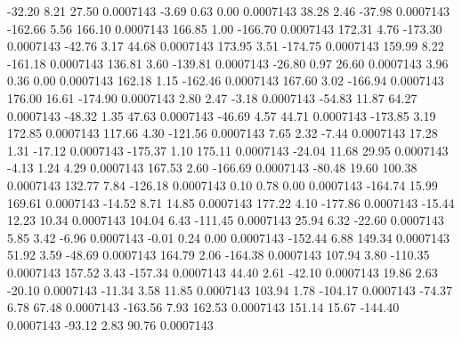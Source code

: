       -32.20        8.21       27.50     0.0007143
       -3.69        0.63        0.00     0.0007143
       38.28        2.46      -37.98     0.0007143
     -162.66        5.56      166.10     0.0007143
      166.85        1.00     -166.70     0.0007143
      172.31        4.76     -173.30     0.0007143
      -42.76        3.17       44.68     0.0007143
      173.95        3.51     -174.75     0.0007143
      159.99        8.22     -161.18     0.0007143
      136.81        3.60     -139.81     0.0007143
      -26.80        0.97       26.60     0.0007143
        3.96        0.36        0.00     0.0007143
      162.18        1.15     -162.46     0.0007143
      167.60        3.02     -166.94     0.0007143
      176.00       16.61     -174.90     0.0007143
        2.80        2.47       -3.18     0.0007143
      -54.83       11.87       64.27     0.0007143
      -48.32        1.35       47.63     0.0007143
      -46.69        4.57       44.71     0.0007143
     -173.85        3.19      172.85     0.0007143
      117.66        4.30     -121.56     0.0007143
        7.65        2.32       -7.44     0.0007143
       17.28        1.31      -17.12     0.0007143
     -175.37        1.10      175.11     0.0007143
      -24.04       11.68       29.95     0.0007143
       -4.13        1.24        4.29     0.0007143
      167.53        2.60     -166.69     0.0007143
      -80.48       19.60      100.38     0.0007143
      132.77        7.84     -126.18     0.0007143
        0.10        0.78        0.00     0.0007143
     -164.74       15.99      169.61     0.0007143
      -14.52        8.71       14.85     0.0007143
      177.22        4.10     -177.86     0.0007143
      -15.44       12.23       10.34     0.0007143
      104.04        6.43     -111.45     0.0007143
       25.94        6.32      -22.60     0.0007143
        5.85        3.42       -6.96     0.0007143
       -0.01        0.24        0.00     0.0007143
     -152.44        6.88      149.34     0.0007143
       51.92        3.59      -48.69     0.0007143
      164.79        2.06     -164.38     0.0007143
      107.94        3.80     -110.35     0.0007143
      157.52        3.43     -157.34     0.0007143
       44.40        2.61      -42.10     0.0007143
       19.86        2.63      -20.10     0.0007143
      -11.34        3.58       11.85     0.0007143
      103.94        1.78     -104.17     0.0007143
      -74.37        6.78       67.48     0.0007143
     -163.56        7.93      162.53     0.0007143
      151.14       15.67     -144.40     0.0007143
      -93.12        2.83       90.76     0.0007143
